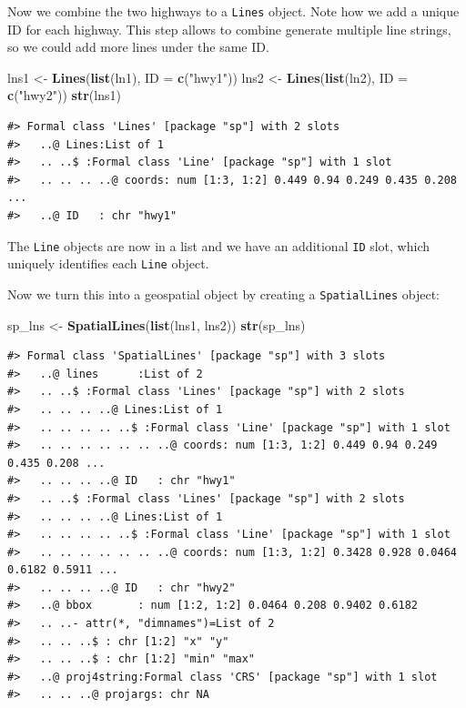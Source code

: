 \documentclass[]{book}
\newenvironment{Shaded}{\begin{snugshade}}{\end{snugshade}}
\newcommand{\KeywordTok}[1]{\textcolor[rgb]{0.13,0.29,0.53}{\textbf{#1}}}
\newcommand{\DataTypeTok}[1]{\textcolor[rgb]{0.13,0.29,0.53}{#1}}
\newcommand{\StringTok}[1]{\textcolor[rgb]{0.31,0.60,0.02}{#1}}
\newcommand{\NormalTok}[1]{#1}
\begin{document}
Now we combine the two highways to a \texttt{Lines} object. Note how we
add a unique ID for each highway. This step allows to combine generate
multiple line strings, so we could add more lines under the same ID.

\begin{Shaded}
\begin{Highlighting}[]
\NormalTok{lns1 <-}\StringTok{ }\KeywordTok{Lines}\NormalTok{(}\KeywordTok{list}\NormalTok{(ln1), }\DataTypeTok{ID =} \KeywordTok{c}\NormalTok{(}\StringTok{"hwy1"}\NormalTok{)) }
\NormalTok{lns2 <-}\StringTok{ }\KeywordTok{Lines}\NormalTok{(}\KeywordTok{list}\NormalTok{(ln2), }\DataTypeTok{ID =} \KeywordTok{c}\NormalTok{(}\StringTok{"hwy2"}\NormalTok{)) }
\KeywordTok{str}\NormalTok{(lns1)}
\end{Highlighting}
\end{Shaded}

\begin{verbatim}
#> Formal class 'Lines' [package "sp"] with 2 slots
#>   ..@ Lines:List of 1
#>   .. ..$ :Formal class 'Line' [package "sp"] with 1 slot
#>   .. .. .. ..@ coords: num [1:3, 1:2] 0.449 0.94 0.249 0.435 0.208 ...
#>   ..@ ID   : chr "hwy1"
\end{verbatim}

The \texttt{Line} objects are now in a list and we have an additional
\texttt{ID} slot, which uniquely identifies each \texttt{Line} object.

Now we turn this into a geospatial object by creating a
\texttt{SpatialLines} object:

\begin{Shaded}
\begin{Highlighting}[]
\NormalTok{sp_lns <-}\StringTok{ }\KeywordTok{SpatialLines}\NormalTok{(}\KeywordTok{list}\NormalTok{(lns1, lns2))}
\KeywordTok{str}\NormalTok{(sp_lns)}
\end{Highlighting}
\end{Shaded}

\begin{verbatim}
#> Formal class 'SpatialLines' [package "sp"] with 3 slots
#>   ..@ lines      :List of 2
#>   .. ..$ :Formal class 'Lines' [package "sp"] with 2 slots
#>   .. .. .. ..@ Lines:List of 1
#>   .. .. .. .. ..$ :Formal class 'Line' [package "sp"] with 1 slot
#>   .. .. .. .. .. .. ..@ coords: num [1:3, 1:2] 0.449 0.94 0.249 0.435 0.208 ...
#>   .. .. .. ..@ ID   : chr "hwy1"
#>   .. ..$ :Formal class 'Lines' [package "sp"] with 2 slots
#>   .. .. .. ..@ Lines:List of 1
#>   .. .. .. .. ..$ :Formal class 'Line' [package "sp"] with 1 slot
#>   .. .. .. .. .. .. ..@ coords: num [1:3, 1:2] 0.3428 0.928 0.0464 0.6182 0.5911 ...
#>   .. .. .. ..@ ID   : chr "hwy2"
#>   ..@ bbox       : num [1:2, 1:2] 0.0464 0.208 0.9402 0.6182
#>   .. ..- attr(*, "dimnames")=List of 2
#>   .. .. ..$ : chr [1:2] "x" "y"
#>   .. .. ..$ : chr [1:2] "min" "max"
#>   ..@ proj4string:Formal class 'CRS' [package "sp"] with 1 slot
#>   .. .. ..@ projargs: chr NA
\end{verbatim}
\end{document}
